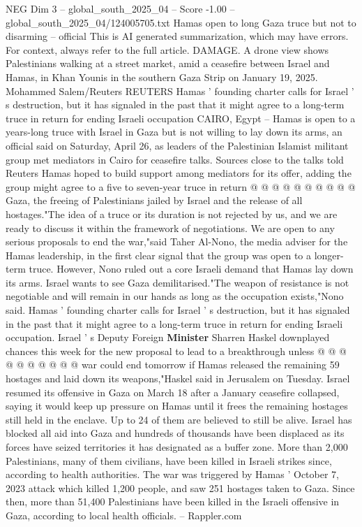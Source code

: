\begin{textsample}{NEG Dim 3 – global\_south\_2025\_04 – Score -1.00 – global\_south\_2025\_04/124005705.txt}  \label{ex:f3_neg_338}
Hamas open to long Gaza truce but not to disarming -- official This is AI generated summarization, which may have errors.
For context, always refer to the full article.
DAMAGE.
A drone view shows Palestinians walking at a street market, amid a ceasefire between Israel and Hamas, in Khan Younis in the southern Gaza Strip on January 19, 2025.
Mohammed Salem/Reuters REUTERS Hamas ' founding charter calls for Israel ' s destruction, but it has signaled in the past that it might agree to a long-term truce in return for ending Israeli occupation CAIRO, Egypt -- Hamas is open to a years-long truce with Israel in Gaza but is not willing to lay down its arms, an official said on Saturday, April 26, as leaders of the Palestinian Islamist militant group met mediators in Cairo for ceasefire talks.
Sources close to the talks told Reuters Hamas hoped to build support among mediators for its offer, adding the group might agree to a five to seven-year truce in return @ @ @ @ @ @ @ @ @ @ Gaza, the freeing of Palestinians jailed by Israel and the release of all hostages."The idea of a truce or its duration is not rejected by us, and we are ready to discuss it within the framework of negotiations.
We are open to any serious proposals to end the war,"said Taher Al-Nono, the media adviser for the Hamas leadership, in the first clear signal that the group was open to a longer-term truce.
However, Nono ruled out a core Israeli demand that Hamas lay down its arms.
Israel wants to see Gaza demilitarised."The weapon of resistance is not negotiable and will remain in our hands as long as the occupation exists,"Nono said.
Hamas ' founding charter calls for Israel ' s destruction, but it has signaled in the past that it might agree to a long-term truce in return for ending Israeli occupation.
Israel ' s Deputy Foreign \textbf{Minister} Sharren Haskel downplayed chances this week for the new proposal to lead to a breakthrough unless @ @ @ @ @ @ @ @ @ @ war could end tomorrow if Hamas released the remaining 59 hostages and laid down its weapons,"Haskel said in Jerusalem on Tuesday.
Israel resumed its offensive in Gaza on March 18 after a January ceasefire collapsed, saying it would keep up pressure on Hamas until it frees the remaining hostages still held in the enclave.
Up to 24 of them are believed to still be alive.
Israel has blocked all aid into Gaza and hundreds of thousands have been displaced as its forces have seized territories it has designated as a buffer zone.
More than 2,000 Palestinians, many of them civilians, have been killed in Israeli strikes since, according to health authorities.
The war was triggered by Hamas ' October 7, 2023 attack which killed 1,200 people, and saw 251 hostages taken to Gaza.
Since then, more than 51,400 Palestinians have been killed in the Israeli offensive in Gaza, according to local health officials. -- Rappler.com

\end{textsample}
